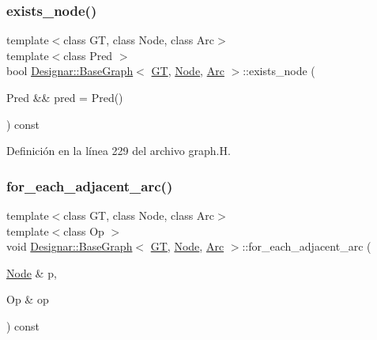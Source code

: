 \subsubsection{\texorpdfstring{exists\+\_\+node()}{exists\_node()}\hspace{0.1cm}{\footnotesize\ttfamily [2/2]}}
{\footnotesize\ttfamily template$<$class GT, class Node, class Arc$>$ \\
template$<$class Pred $>$ \\
bool \hyperlink{class_designar_1_1_base_graph}{Designar\+::\+Base\+Graph}$<$ \hyperlink{demo-buildgraph_8_c_a3001c40d2c31ca87ed96cd7d1334a55e}{GT}, \hyperlink{namespace_designar_a5af326c65aa2bd26b26c410f2030d09e}{Node}, \hyperlink{namespace_designar_a3f55fb5513d62ff47cbc8f72b8e95d6f}{Arc} $>$\+::exists\+\_\+node (\begin{DoxyParamCaption}\item[{Pred \&\&}]{pred = {\ttfamily Pred()} }\end{DoxyParamCaption}) const\hspace{0.3cm}{\ttfamily [inline]}}



Definición en la línea 229 del archivo graph.\+H.

\mbox{\label{class_designar_1_1_base_graph_a5e35c97bdf055f67e744f7d961ccb6a9}} 
\subsubsection{\texorpdfstring{for\+\_\+each\+\_\+adjacent\+\_\+arc()}{for\_each\_adjacent\_arc()}\hspace{0.1cm}{\footnotesize\ttfamily [1/2]}}
{\footnotesize\ttfamily template$<$class GT, class Node, class Arc$>$ \\
template$<$class Op $>$ \\
void \hyperlink{class_designar_1_1_base_graph}{Designar\+::\+Base\+Graph}$<$ \hyperlink{demo-buildgraph_8_c_a3001c40d2c31ca87ed96cd7d1334a55e}{GT}, \hyperlink{namespace_designar_a5af326c65aa2bd26b26c410f2030d09e}{Node}, \hyperlink{namespace_designar_a3f55fb5513d62ff47cbc8f72b8e95d6f}{Arc} $>$\+::for\+\_\+each\+\_\+adjacent\+\_\+arc (\begin{DoxyParamCaption}\item[{\hyperlink{namespace_designar_a5af326c65aa2bd26b26c410f2030d09e}{Node} \&}]{p,  }\item[{Op \&}]{op }\end{DoxyParamCaption}) const\hspace{0.3cm}{\ttfamily [inline]}}



